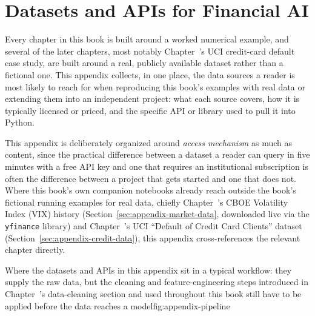\documentclass[../ai_in_finance]{subfiles}
\begin{document}
\appendix
{}
\chapter{Datasets and APIs for Financial AI}
\label{app:datasets}


Every chapter in this book is built around a worked numerical example, and several of the later chapters, most notably Chapter~'s UCI credit-card default case study, are built around a real, publicly available dataset rather than a fictional one. This appendix collects, in one place, the data sources a reader is most likely to reach for when reproducing this book's examples with real data or extending them into an independent project: what each source covers, how it is typically licensed or priced, and the specific API or library used to pull it into Python.

This appendix is deliberately organized around \emph{access mechanism} as much as content, since the practical difference between a dataset a reader can query in five minutes with a free API key and one that requires an institutional subscription is often the difference between a project that gets started and one that does not. Where this book's own companion notebooks already reach outside the book's fictional running examples for real data, chiefly Chapter~'s CBOE Volatility Index (VIX) history (Section~\ref{sec:appendix-market-data}, downloaded live via the \texttt{yfinance} library) and Chapter~'s UCI ``Default of Credit Card Clients'' dataset (Section~\ref{sec:appendix-credit-data}), this appendix cross-references the relevant chapter directly.

\begin{bookfigure}{Where the datasets and APIs in this appendix sit in a typical workflow: they supply the raw data, but the cleaning and feature-engineering steps introduced in Chapter~'s data-cleaning section and used throughout this book still have to be applied before the data reaches a model}{fig:appendix-pipeline}
\end{bookfigure}
\end{document}
